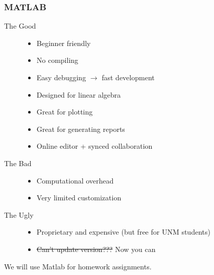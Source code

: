 \documentclass[10pt]{beamer}
\begin{document}
\begin{frame}
\frametitle{MATLAB}
\begin{description}
    \item[The Good]  
        \begin{itemize}
        \item Beginner friendly
        \item No compiling
        \item Easy debugging $\rightarrow$ fast development
        \item Designed for linear algebra
        \item Great for plotting
        \item Great for generating reports
        \item Online editor + synced collaboration
        \end{itemize}
    \item[The Bad] 
        \begin{itemize}
        \item Computational overhead
        \item Very limited customization
        \end{itemize}
    \item[The Ugly]
        \begin{itemize}
        \item Proprietary and expensive (but free for UNM students)
        \item \sout{Can't update version???} Now you can
        \end{itemize}
\end{description}

\vspace{5mm}

\begin{center}
We will use Matlab for homework assignments. 
\end{center}
\end{frame}

\end{document}

